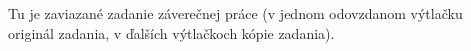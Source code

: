 Tu je zaviazané zadanie  záverečnej práce (v jednom odovzdanom výtlačku originál zadania, v ďalších výtlačkoch kópie zadania).

\cleardoublepage 

	
